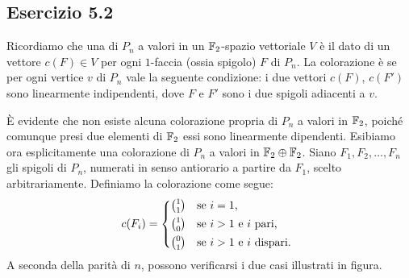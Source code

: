 \subsection*{Esercizio 5.2}
Ricordiamo che una  di $P_n$ a valori in un $\mathbb{F}_2$-spazio vettoriale $V$ è il dato di un vettore $c(F)\in V$ per ogni $1$-faccia (ossia spigolo) $F$ di $P_n$. La colorazione è  se per ogni vertice $v$ di $P_n$  vale la seguente condizione: i due vettori $c(F)$, $c(F')$ sono linearmente indipendenti, dove $F$ e $F'$ sono i due spigoli adiacenti a $v$.

È evidente che non esiste alcuna colorazione propria di $P_n$ a valori in $\mathbb{F}_2$, poiché comunque presi due elementi di $\mathbb{F}_2$ essi sono linearmente dipendenti. Esibiamo ora esplicitamente una colorazione di $P_n$ a valori in $\mathbb{F}_2\oplus\mathbb{F}_2$. Siano $F_1,F_2,\ldots,F_n$ gli spigoli di $P_n$, numerati in senso antiorario a partire da $F_1$, scelto arbitrariamente. Definiamo la colorazione come segue:
\[
c(F_i)=\begin{cases*}
1\choose1&se $i=1$,\\
1\choose0&se $i>1$ e $i$ pari,\\
0\choose1&se $i>1$ e $i$ dispari.
\end{cases*}
\]
A seconda della parità di $n$, possono verificarsi i due casi illustrati in figura.

